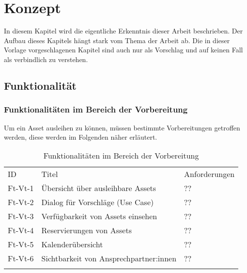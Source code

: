 \chapter{Konzept}
\label{chapter-konzept}

In diesem Kapitel wird die eigentliche Erkenntnis dieser Arbeit beschrieben. Der Aufbau dieses
Kapitels hängt stark vom Thema der Arbeit ab. Die in dieser Vorlage vorgeschlagenen Kapitel sind
auch nur als Vorschlag und auf keinen Fall als verbindlich zu verstehen.

\section{Funktionalität}
\subsection{Funktionalitäten im Bereich der Vorbereitung}
Um ein Asset ausleihen zu können, müssen bestimmte Vorbereitungen getroffen werden, diese werden im
Folgenden näher erläutert.

\begin{table}[h]
    \centering
    \caption{Funktionalitäten im Bereich der Vorbereitung}
    \begin{tabular}{lll}
            \arrayrulecolor{maincolor}\hline
            \sffamily\color{maincolor}ID & \sffamily\color{maincolor}Titel &
            \sffamily\color{maincolor}Anforderungen \\
            \arrayrulecolor{maincolor}\hline
            Ft-Vt-1 & Übersicht über ausleihbare Assets                         & ?? \\
            Ft-Vt-2 & Dialog für Vorschläge (Use Case)                          & ?? \\
            Ft-Vt-3 & Verfügbarkeit von Assets einsehen                         & ?? \\
            Ft-Vt-4 & Reservierungen von Assets                                 & ?? \\
            Ft-Vt-5 & Kalenderübersicht                                         & ?? \\
            Ft-Vt-6 & Sichtbarkeit von Ansprechpartner:innen                    & ?? \\
            \arrayrulecolor{maincolor}\hline
    \end{tabular}
    \label{table:ft-vt}
\end{table}

